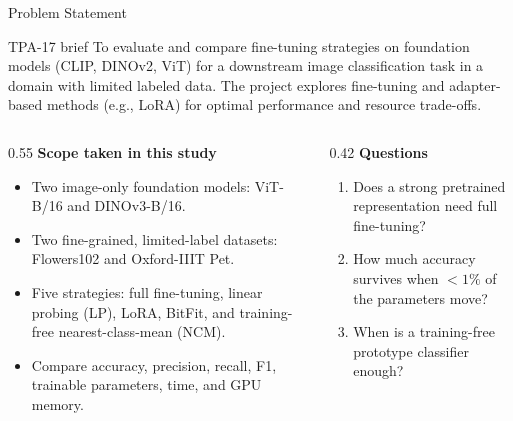 \documentclass[10pt, aspectratio=169]{beamer}
\begin{document}
\begin{frame}[t]{Problem Statement}
  \begin{alertblock}{TPA-17 brief}
    \small
    To evaluate and compare fine-tuning strategies on foundation models (CLIP, DINOv2, ViT) for a downstream image classification task in a domain with limited labeled data. The project explores fine-tuning and adapter-based methods (e.g., LoRA) for optimal performance and resource trade-offs.
  \end{alertblock}

  \vspace{0.15cm}
  \begin{columns}[T]
    \begin{column}{0.55\textwidth}
      \small
      \textbf{Scope taken in this study}
      \begin{itemize}
        \item Two image-only foundation models: ViT-B/16 and DINOv3-B/16.
        \item Two fine-grained, limited-label datasets: Flowers102 and Oxford-IIIT Pet.
        \item Five strategies: full fine-tuning, linear probing (LP), LoRA, BitFit, and training-free nearest-class-mean (NCM).
        \item Compare accuracy, precision, recall, F1, trainable parameters, time, and GPU memory.
      \end{itemize}
    \end{column}
    \begin{column}{0.42\textwidth}
      \small
      \textbf{Questions}
      \begin{enumerate}
        \item Does a strong pretrained representation need full fine-tuning?
        \item How much accuracy survives when $<1\%$ of the parameters move?
        \item When is a training-free prototype classifier enough?
      \end{enumerate}
    \end{column}
  \end{columns}
\end{frame}
\end{document}
